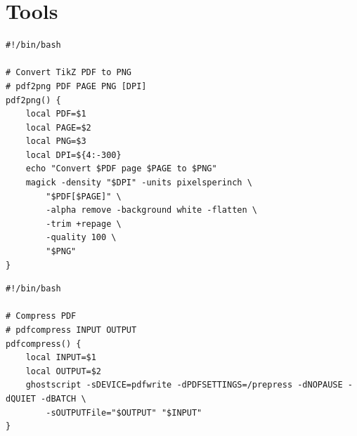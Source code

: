 \documentclass{article}
\begin{document}
\appendix
\section{Tools}
\small
\begin{verbatim}
#!/bin/bash

# Convert TikZ PDF to PNG
# pdf2png PDF PAGE PNG [DPI]
pdf2png() {
    local PDF=$1
    local PAGE=$2
    local PNG=$3
    local DPI=${4:-300}
    echo "Convert $PDF page $PAGE to $PNG"
    magick -density "$DPI" -units pixelsperinch \
        "$PDF[$PAGE]" \
        -alpha remove -background white -flatten \
        -trim +repage \
        -quality 100 \
        "$PNG"
}
\end{verbatim}

\begin{verbatim}
#!/bin/bash

# Compress PDF
# pdfcompress INPUT OUTPUT
pdfcompress() {
    local INPUT=$1
    local OUTPUT=$2
    ghostscript -sDEVICE=pdfwrite -dPDFSETTINGS=/prepress -dNOPAUSE -dQUIET -dBATCH \
        -sOUTPUTFile="$OUTPUT" "$INPUT"
}
\end{verbatim}

\printbibliography
\end{document}
